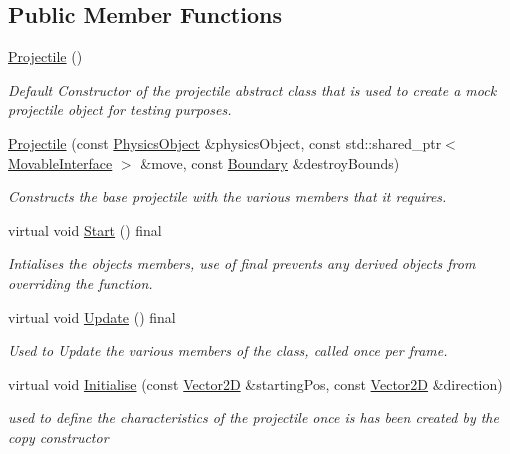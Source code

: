 \subsection*{Public Member Functions}
\begin{DoxyCompactItemize}
\item 
\mbox{\label{class_projectile_ac536ed2aad56af866a2078b9a85aa16d}} 
\hyperlink{class_projectile_ac536ed2aad56af866a2078b9a85aa16d}{Projectile} ()
\begin{DoxyCompactList}\small\item\em Default Constructor of the projectile abstract class that is used to create a mock projectile object for testing purposes. \end{DoxyCompactList}\item 
\hyperlink{class_projectile_a4ff1ec79a15e7821ac5ccfd6dda9205f}{Projectile} (const \hyperlink{class_physics_object}{Physics\+Object} \&physics\+Object, const std\+::shared\+\_\+ptr$<$ \hyperlink{class_movable_interface}{Movable\+Interface} $>$ \&move, const \hyperlink{class_boundary}{Boundary} \&destroy\+Bounds)
\begin{DoxyCompactList}\small\item\em Constructs the base projectile with the various members that it requires. \end{DoxyCompactList}\item 
\mbox{\label{class_projectile_a27a59059730a66a37feec766ebe08fa2}} 
virtual void \hyperlink{class_projectile_a27a59059730a66a37feec766ebe08fa2}{Start} () final
\begin{DoxyCompactList}\small\item\em Intialises the objects members, use of final prevents any derived objects from overriding the function. \end{DoxyCompactList}\item 
virtual void \hyperlink{class_projectile_a1f9df5dd65fed410d4e897eb63edc1c9}{Update} () final
\begin{DoxyCompactList}\small\item\em Used to Update the various members of the class, called once per frame. \end{DoxyCompactList}\item 
virtual void \hyperlink{class_projectile_a8c1501698a272f3ae0def6bdc6b3d763}{Initialise} (const \hyperlink{class_vector2_d}{Vector2D} \&starting\+Pos, const \hyperlink{class_vector2_d}{Vector2D} \&direction)
\begin{DoxyCompactList}\small\item\em used to define the characteristics of the projectile once is has been created by the copy constructor \end{DoxyCompactList}\end{DoxyCompactItemize}
